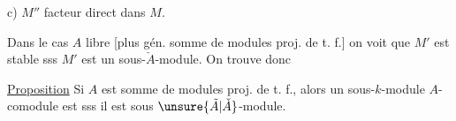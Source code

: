 c) $M''$ facteur direct dans $M$.


Dans le cas $A$ libre [plus gén. somme de modules proj. de t. f.] on voit que $M'$ est stable sss $M'$ est  un sous-$\check{A}$-module. On trouve donc

\uline{Proposition} Si $A$ est somme de modules proj. de t. f., alors un sous-$k$-module  $A$-comodule est  sss il est   sous $\unsure{\tilde{A}|\check{A}}$-module.
